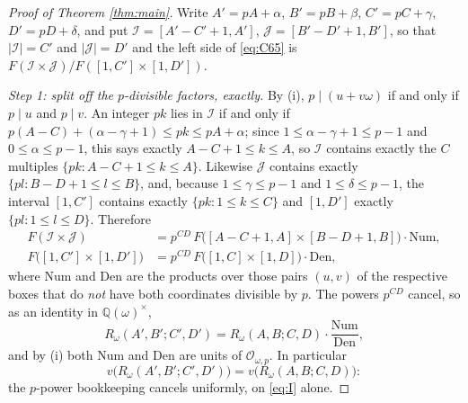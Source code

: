\documentclass[11pt]{amsart}
\theoremstyle{remark}
\newcommand{\OO}{\mathcal{O}}
\newcommand{\Rw}{R_{\omega}}
\newcommand{\QQ}{\mathbb{Q}}
\begin{document}
\begin{proof}[Proof of Theorem \ref{thm:main}]
Write $A'=pA+\alpha$, $B'=pB+\beta$, $C'=pC+\gamma$, $D'=pD+\delta$, and
put $\mathcal I=[A'-C'+1,A']$, $\mathcal J=[B'-D'+1,B']$, so that
$|\mathcal I|=C'$ and $|\mathcal J|=D'$ and the left side of
\eqref{eq:C65} is
$F(\mathcal I\times\mathcal J)/F([1,C']\times[1,D'])$.

\smallskip
\noindent\emph{Step 1: split off the $p$-divisible factors, exactly.}
By (i), $p\mid(u+v\omega)$ if and only if $p\mid u$ and $p\mid v$. An
integer $pk$ lies in $\mathcal I$ if and only if
$p(A-C)+(\alpha-\gamma+1)\le pk\le pA+\alpha$; since
$1\le\alpha-\gamma+1\le p-1$ and $0\le\alpha\le p-1$, this says exactly
$A-C+1\le k\le A$, so $\mathcal I$ contains exactly the $C$ multiples
$\{pk:A-C+1\le k\le A\}$. Likewise $\mathcal J$ contains exactly
$\{pl:B-D+1\le l\le B\}$, and, because $1\le\gamma\le p-1$ and
$1\le\delta\le p-1$, the interval $[1,C']$ contains exactly
$\{pk:1\le k\le C\}$ and $[1,D']$ exactly $\{pl:1\le l\le D\}$. Therefore
\begin{align*}
 F(\mathcal I\times\mathcal J)
  &=p^{CD}\,F\bigl([A-C+1,A]\times[B-D+1,B]\bigr)\cdot \mathrm{Num},\\
 F\bigl([1,C']\times[1,D']\bigr)
  &=p^{CD}\,F\bigl([1,C]\times[1,D]\bigr)\cdot \mathrm{Den},
\end{align*}
where $\mathrm{Num}$ and $\mathrm{Den}$ are the products over those pairs
$(u,v)$ of the respective boxes that do \emph{not} have both coordinates
divisible by $p$. The powers $p^{CD}$ cancel, so as an identity in
$\QQ(\omega)^{\times}$,
\begin{equation}\label{eq:step1}
 \Rw(A',B';C',D')=\Rw(A,B;C,D)\cdot\frac{\mathrm{Num}}{\mathrm{Den}},
\end{equation}
and by (i) both $\mathrm{Num}$ and $\mathrm{Den}$ are units of
$\OO_{\omega,p}$. In particular
\[
 v\bigl(\Rw(A',B';C',D')\bigr)=v\bigl(\Rw(A,B;C,D)\bigr):
\]
the $p$-power bookkeeping cancels uniformly, on \eqref{eq:I} alone.


\end{proof}
\end{document}
